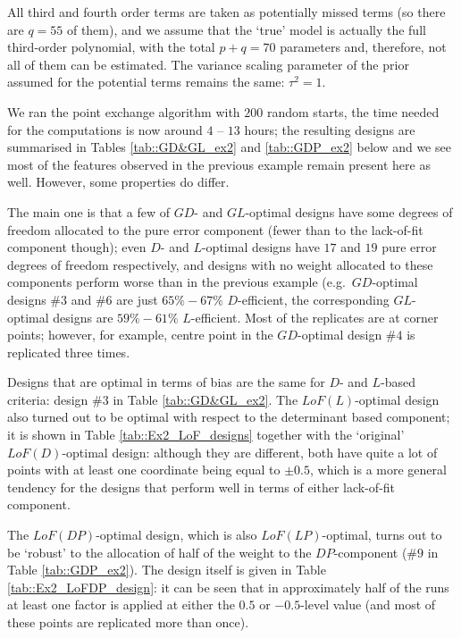 All third and fourth order terms are taken as potentially missed terms (so there are $q=55$ of them), and we assume that the `true' model is actually the full third-order polynomial, with the total $p+q=70$ parameters and, therefore, not all of them can be estimated. The variance scaling parameter of the prior assumed for the potential terms remains the same: $\tau^2=1$.

We ran the point exchange algorithm with $200$ random starts, the time needed for the computations is now around $4$ -- $13$ hours; the resulting designs are summarised in Tables \ref{tab::GD&GL_ex2} and \ref{tab::GDP_ex2} below and we see most of the features  observed in the previous example remain present here as well. However, some properties do differ.

The main one is that a few of $GD$- and $GL$-optimal  designs have some degrees of freedom allocated to the pure error component (fewer than to the lack-of-fit component though); even $D$- and $L$-optimal designs have $17$ and $19$ pure error degrees of freedom respectively, and designs with no weight allocated to these components perform worse than in the previous example (e.g.~$GD$-optimal designs \#$3$ and \#$6$ are just $65\%-67\%$ $D$-efficient, the corresponding $GL$-optimal designs are $59\%-61\%$ $L$-efficient. Most of the replicates are at corner points; however, for example, centre point in the $GD$-optimal design \#$4$ is replicated three times. 

Designs that are optimal in terms of bias are the same for $D$- and $L$-based criteria: design \#$3$ in Table \ref{tab::GD&GL_ex2}. The $LoF(L)$-optimal design also turned out to be optimal with respect to the determinant based component; it is shown in Table \ref{tab::Ex2_LoF_designs} together with the `original' $LoF(D)$-optimal design: although they are different, both have quite a lot of points with at least one coordinate being equal to $\pm 0.5$, which is a more general tendency for the designs that perform well in terms of either lack-of-fit component.

The $LoF(DP)$-optimal design, which is also $LoF(LP)$-optimal, turns out to be `robust' to the allocation of half of the weight to the $DP$-component (\#$9$ in Table \ref{tab::GDP_ex2}). The design itself is given in Table \ref{tab::Ex2_LoFDP_design}: it can be seen that in approximately half of the runs at least one factor is applied at either the $0.5$ or $-0.5$-level value (and most of these points are replicated more than once).


